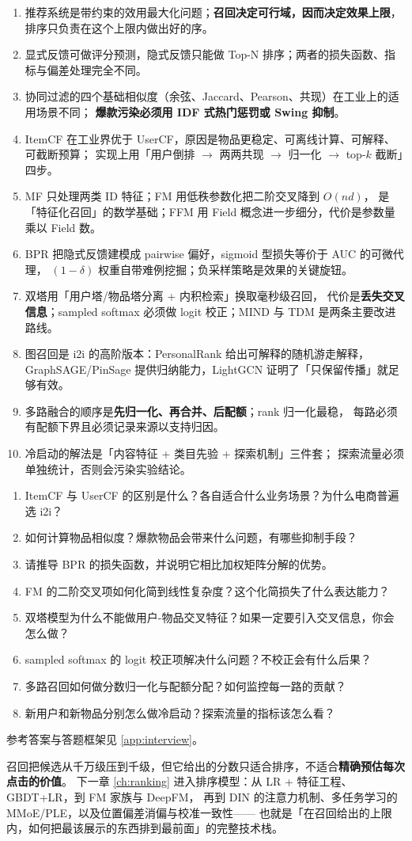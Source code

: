 \begin{keypoint}[本章要点回顾]
\begin{enumerate}
  \item 推荐系统是带约束的效用最大化问题；\textbf{召回决定可行域，因而决定效果上限}，
        排序只负责在这个上限内做出好的序。
  \item 显式反馈可做评分预测，隐式反馈只能做 Top-N 排序；两者的损失函数、指标与偏差处理完全不同。
  \item 协同过滤的四个基础相似度（余弦、Jaccard、Pearson、共现）在工业上的适用场景不同；
        \textbf{爆款污染必须用 IDF 式热门惩罚或 Swing 抑制}。
  \item ItemCF 在工业界优于 UserCF，原因是物品更稳定、可离线计算、可解释、可截断预算；
        实现上用「用户倒排 $\to$ 两两共现 $\to$ 归一化 $\to$ top-$k$ 截断」四步。
  \item MF 只处理两类 ID 特征；FM 用低秩参数化把二阶交叉降到 $O(nd)$，
        是「特征化召回」的数学基础；FFM 用 Field 概念进一步细分，代价是参数量乘以 Field 数。
  \item BPR 把隐式反馈建模成 pairwise 偏好，sigmoid 型损失等价于 AUC 的可微代理，
        $(1-\delta)$ 权重自带难例挖掘；负采样策略是效果的关键旋钮。
  \item 双塔用「用户塔/物品塔分离 + 内积检索」换取毫秒级召回，
        代价是\textbf{丢失交叉信息}；sampled softmax 必须做 logit 校正；MIND 与 TDM 是两条主要改进路线。
  \item 图召回是 i2i 的高阶版本：PersonalRank 给出可解释的随机游走解释，
        GraphSAGE/PinSage 提供归纳能力，LightGCN 证明了「只保留传播」就足够有效。
  \item 多路融合的顺序是\textbf{先归一化、再合并、后配额}；rank 归一化最稳，
        每路必须有配额下界且必须记录来源以支持归因。
  \item 冷启动的解法是「内容特征 + 类目先验 + 探索机制」三件套；
        探索流量必须单独统计，否则会污染实验结论。
\end{enumerate}
\end{keypoint}

\begin{interview}[本章对应的面试题]
\begin{enumerate}
  \item ItemCF 与 UserCF 的区别是什么？各自适合什么业务场景？为什么电商普遍选 i2i？
  \item 如何计算物品相似度？爆款物品会带来什么问题，有哪些抑制手段？
  \item 请推导 BPR 的损失函数，并说明它相比加权矩阵分解的优势。
  \item FM 的二阶交叉项如何化简到线性复杂度？这个化简损失了什么表达能力？
  \item 双塔模型为什么不能做用户-物品交叉特征？如果一定要引入交叉信息，你会怎么做？
  \item sampled softmax 的 logit 校正项解决什么问题？不校正会有什么后果？
  \item 多路召回如何做分数归一化与配额分配？如何监控每一路的贡献？
  \item 新用户和新物品分别怎么做冷启动？探索流量的指标该怎么看？
\end{enumerate}
参考答案与答题框架见 \cref{app:interview}。
\end{interview}

召回把候选从千万级压到千级，但它给出的分数只适合排序，不适合\textbf{精确预估每次点击的价值}。
下一章 \cref{ch:ranking} 进入排序模型：从 LR + 特征工程、GBDT+LR，到 FM 家族与 DeepFM，
再到 DIN 的注意力机制、多任务学习的 MMoE/PLE，以及位置偏差消偏与校准一致性——
也就是「在召回给出的上限内，如何把最该展示的东西排到最前面」的完整技术栈。
